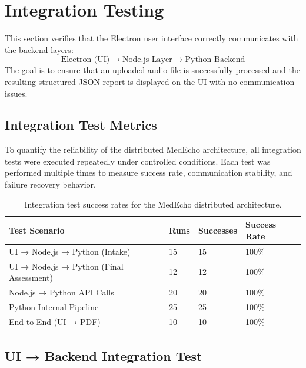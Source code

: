 
\section{Integration Testing}
\label{sec:testing:integration}

This section verifies that the Electron user interface correctly communicates with the backend layers:
\[
\text{Electron (UI)} \rightarrow \text{Node.js Layer} \rightarrow \text{Python Backend}
\]
The goal is to ensure that an uploaded audio file is successfully processed and the resulting structured JSON report is displayed on the UI with no communication issues.
\subsection*{Integration Test Metrics}

To quantify the reliability of the distributed MedEcho architecture, all integration tests were executed repeatedly under controlled conditions. Each test was performed multiple times to measure success rate, communication stability, and failure recovery behavior.

\begin{table}[H]
\centering
\renewcommand{\arraystretch}{1.3}
\begin{tabular}{|p{5cm}|p{3cm}|p{3cm}|p{3cm}|}
\hline
\textbf{Test Scenario} & \textbf{Runs} & \textbf{Successes} & \textbf{Success Rate} \\
\hline
UI → Node.js → Python (Intake) & 15 & 15 & 100\% \\
\hline
UI → Node.js → Python (Final Assessment) & 12 & 12 & 100\% \\
\hline
Node.js → Python API Calls & 20 & 20 & 100\% \\
\hline
Python Internal Pipeline & 25 & 25 & 100\% \\
\hline
End-to-End (UI → PDF) & 10 & 10 & 100\% \\
\hline
\end{tabular}
\caption{Integration test success rates for the MedEcho distributed architecture.}
\label{tab:integration-metrics}
\end{table}


\subsection{UI → Backend Integration Test}
\label{sec:testing:ui-backend}

